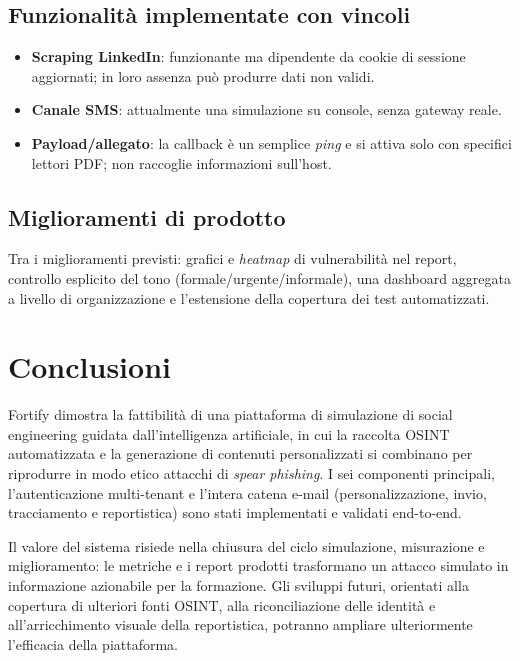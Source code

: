\documentclass[12pt,a4paper,oneside]{report}
\begin{document}
\section{Funzionalit\`a implementate con vincoli}
\begin{itemize}[nosep]
  \item \textbf{Scraping LinkedIn}: funzionante ma dipendente da cookie di sessione
        aggiornati; in loro assenza pu\`o produrre dati non validi.
  \item \textbf{Canale SMS}: attualmente una simulazione su console, senza gateway reale.
  \item \textbf{Payload/allegato}: la callback \`e un semplice \emph{ping} e si attiva solo
        con specifici lettori PDF; non raccoglie informazioni sull'host.
\end{itemize}

\section{Miglioramenti di prodotto}
Tra i miglioramenti previsti: grafici e \emph{heatmap} di vulnerabilit\`a nel report,
controllo esplicito del tono (formale/urgente/informale), una dashboard aggregata a livello
di organizzazione e l'estensione della copertura dei test automatizzati.

\chapter{Conclusioni}
Fortify dimostra la fattibilit\`a di una piattaforma di simulazione di social engineering
guidata dall'intelligenza artificiale, in cui la raccolta OSINT automatizzata e la
generazione di contenuti personalizzati si combinano per riprodurre in modo etico attacchi
di \emph{spear phishing}. I sei componenti principali, l'autenticazione multi-tenant e
l'intera catena e-mail (personalizzazione, invio, tracciamento e reportistica) sono stati
implementati e validati end-to-end.

Il valore del sistema risiede nella chiusura del ciclo simulazione, misurazione e miglioramento:
le metriche e i report prodotti trasformano un attacco simulato in informazione azionabile per
la formazione. Gli sviluppi futuri, orientati alla copertura di ulteriori fonti OSINT, alla
riconciliazione delle identit\`a e all'arricchimento visuale della reportistica, potranno
ampliare ulteriormente l'efficacia della piattaforma.
\end{document}
